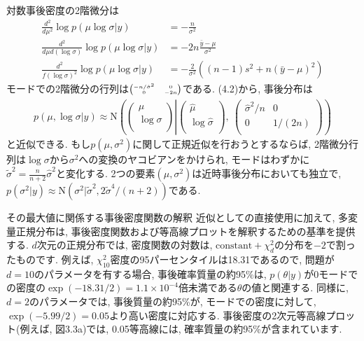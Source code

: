 \documentclass[10pt,dvipdfmx,a4]{beamer}
\newcommand{\eqn}[1]{\begin{align*}#1\end{align*}}
\begin{document}

\begin{frame}
対数事後密度の2階微分は
\eqn{\frac{d^2}{d\mu^2}\log p(\mu\log \sigma|y)&=-\frac{n}{\sigma^2}\\
\frac{d^2}{d\mu d(\log \sigma)}\log p(\mu\log \sigma|y)&=-2n\frac{\bar{y}-\mu}{\sigma^2}\\
\frac{d^2}{f(\log \sigma)^2}\log p(\mu\log \sigma|y)&=-\frac{2}{\sigma^2}((n-1)s^2+n(\bar{y}-\mu)^2)}
モードでの2階微分の行列は${\tiny\begin{pmatrix} -n/\hat{\sigma}^2 & 0 \\ 0 & -2n \\\end{pmatrix}}$である.
(4.2)から, 事後分布は
\eqn{p(\mu,\log \sigma|y)\approx \text{N}\left( 
\begin{pmatrix} \mu \\ \log \sigma \\\end{pmatrix}\left|
\begin{pmatrix} \hat{\mu} \\ \log \hat{\sigma} \\\end{pmatrix}\right.,\ 
\begin{pmatrix} \hat{\sigma}^2/n & 0 \\ 0 & 1/(2n) \\\end{pmatrix}\right)}
と近似できる.
もし$p(\mu,\sigma^2)$に関して正規近似を行おうとするならば, 2階微分行列は$\log \sigma$から$\sigma^2$への変換のヤコビアンをかけられ, モードはわずかに$\tilde{\sigma}^2=\tfrac{n}{n+2}\hat{\sigma}^2$と変化する.
2つの要素$(\mu,\sigma^2)$は近時事後分布においても独立で, $p(\sigma^2|y)\approx\text{N}(\sigma^2|\tilde{\sigma}^2, 2\tilde{\sigma}^4/(n+2))$である.
\end{frame}


\begin{frame}{その最大値に関係する事後密度関数の解釈}
近似としての直接使用に加えて, 多変量正規分布は, 事後密度関数および等高線プロットを解釈するための基準を提供する.
$d$次元の正規分布では, 密度関数の対数は, $\text{constant}+\chi^2_d$の分布を$-2$で割ったものです.
例えば, $\chi^2_{10}$密度の95パーセンタイルは18.31であるので, 問題が$d=10$のパラメータを有する場合, 事後確率質量の約95\%は, $p(\theta|y)$が0モードでの密度の$\exp(-18.31/2)=1.1\times10^{-4}$倍未満である$\theta$の値と関連する.
同様に, $d=2$のパラメータでは, 事後質量の約95\%が, モードでの密度に対して, $\exp(-5.99/2)=0.05$より高い密度に対応する.
事後密度の2次元等高線プロット(例えば, 図3.3a)では, 0.05等高線には, 確率質量の約95\%が含まれています.
\end{frame}
\end{document}
